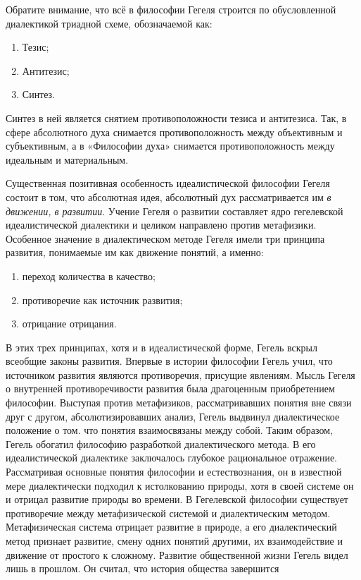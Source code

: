 \documentclass[12pt]{article}
\begin{document}
Обратите внимание, что всё в философии Гегеля строится по обусловленной диалектикой триадной схеме, обозначаемой как:
\begin{enumerate}
	\item Тезис;
	\item Антитезис;
	\item Синтез.
\end{enumerate}
Синтез в ней является снятием противоположности тезиса и антитезиса.
Так, в сфере абсолютного духа снимается противоположность между объективным и субъективным,
а в «Философии духа» снимается противоположность между идеальным и материальным.

Существенная позитивная особенность идеалистической философии Гегеля состоит в том, что абсолютная идея, абсолютный
дух рассматривается им \textit{в движении, в развитии}.
Учение Гегеля о развитии составляет ядро гегелевской
идеалистической диалектики и целиком направлено против 
метафизики. Особенное значение в диалектическом методе Гегеля имели три принципа развития, понимаемые им как движение понятий, а именно:
\begin{enumerate}
	\item переход количества в качество;
	\item противоречие как источник развития;
	\item отрицание отрицания.
\end{enumerate}
В этих трех принципах, хотя и в идеалистической форме, Гегель вскрыл всеобщие законы развития.
Впервые в истории философии Гегель учил, что источником развития являются противоречия, присущие явлениям.
Мысль Гегеля о внутренней противоречивости развития была драгоценным приобретением философии.
Выступая против метафизиков, рассматривавших понятия вне связи друг с другом, абсолютизировавших 
анализ, Гегель выдвинул диалектическое положение о том. что понятия взаимосвязаны между собой. Таким
образом, Гегель обогатил философию разработкой диалектического метода. В его идеалистической диалектике
заключалось глубокое рациональное отражение. Рассматривая основные понятия философии и естествознания,
он в известной мере диалектически подходил к истолкованию природы, хотя в своей системе он и отрицал
развитие природы во времени.
В Гегелевской философии существует противоречие между метафизической системой и диалектическим
методом. Метафизическая система отрицает развитие в природе, а его диалектический метод признает развитие,
смену одних понятий другими, их взаимодействие и движение от простого к сложному.
Развитие общественной жизни Гегель видел лишь в прошлом. Он считал, что история общества завершится
\end{document}
